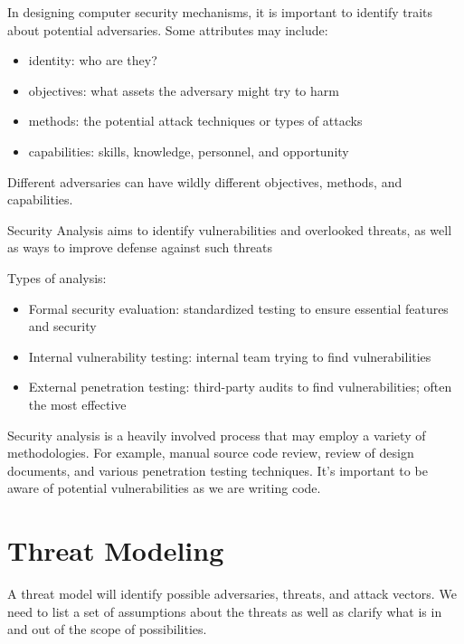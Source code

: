 \documentclass[12pt]{report}
\begin{document}
In designing computer security mechanisms, it is important to identify traits about potential adversaries. Some attributes may include:
\begin{itemize}
    \item identity: who are they?
    \item objectives: what assets the adversary might try to harm
    \item methods: the potential attack techniques or types of attacks
    \item capabilities: skills, knowledge, personnel, and opportunity
\end{itemize}

Different adversaries can have wildly different objectives, methods, and capabilities.

\begin{dfnbox}{Security Analysis}{}
     aims to identify vulnerabilities and overlooked threats, as well as ways to improve defense against such threats
\end{dfnbox}

Types of analysis:
\begin{itemize}
    \item Formal security evaluation: standardized testing to ensure essential features and security
    \item Internal vulnerability testing: internal team trying to find vulnerabilities
    \item External penetration testing: third-party audits to find vulnerabilities; often the most effective
\end{itemize}

Security analysis is a heavily involved process that may employ a variety of methodologies. For example, manual source code review, review of design documents, and various penetration testing techniques. It's important to be aware of potential vulnerabilities as we are writing code.

\section{Threat Modeling}
A threat model will identify possible adversaries, threats, and attack vectors. We need to list a set of assumptions about the threats as well as clarify what is in and out of the scope of possibilities.
\end{document}

